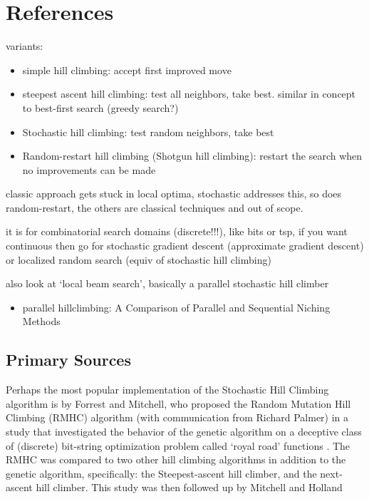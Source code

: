 \documentclass[a4paper, 11pt]{article}
\begin{document}
\section{References}
\label{sec:references}

variants:
\begin{itemize}
	\item simple hill climbing: accept first improved move
	\item steepest ascent hill climbing: test all neighbors, take best. similar in concept to best-first search (greedy search?)
	\item Stochastic hill climbing: test random neighbors, take best
	\item Random-restart hill climbing (Shotgun hill climbing): restart the search when no improvements can be made
\end{itemize}

classic approach gets stuck in local optima, stochastic addresses this, so does random-restart, the others are classical techniques and out of scope.

it is for combinatorial search domains (discrete!!!), like bits or tsp, if you want continuous then go for stochastic gradient descent (approximate gradient descent) or localized random search (equiv of stochastic hill climbing)

also look at `local beam search', basically a parallel stochastic hill climber

\begin{itemize}
	\item parallel hillclimbing: A Comparison of Parallel and Sequential Niching Methods
\end{itemize}



% 
% 
\subsection{Primary Sources}
Perhaps the most popular implementation of the Stochastic Hill Climbing algorithm is by Forrest and Mitchell, who proposed the Random Mutation Hill Climbing (RMHC) algorithm (with communication from Richard Palmer) in a study that investigated the behavior of the genetic algorithm on a deceptive class of (discrete) bit-string optimization problem called `royal road' functions \cite{Forrest1993}. The RMHC was compared to two other hill climbing algorithms in addition to the genetic algorithm, specifically: the Steepest-ascent hill climber, and the next-ascent hill climber. This study was then followed up by Mitchell and Holland \cite{Mitchell1993}
\end{document}
